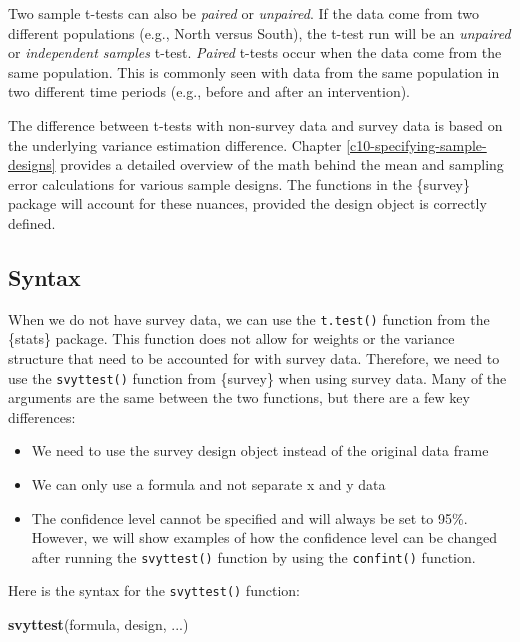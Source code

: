 \documentclass[
]{krantz}
\makeatletter
\newenvironment{Shaded}{\begin{snugshade}}{\end{snugshade}}
\newcommand{\FunctionTok}[1]{\textcolor[rgb]{0.27,0.27,0.27}{\textbf{#1}}}
\newcommand{\NormalTok}[1]{#1}
\providecommand{\tightlist}{%
  \setlength{\itemsep}{0pt}\setlength{\parskip}{0pt}}
\newenvironment{kframe}{%
\medskip{}
\setlength{\fboxsep}{.8em}
 \def\at@end@of@kframe{}%
 \ifinner\ifhmode%
  \def\at@end@of@kframe{\end{minipage}}%
  \begin{minipage}{\columnwidth}%
 \fi\fi%
 \def\FrameCommand##1{\hskip\@totalleftmargin \hskip-\fboxsep
 \colorbox{shadecolor}{##1}\hskip-\fboxsep
     \hskip-\linewidth \hskip-\@totalleftmargin \hskip\columnwidth}%
 \MakeFramed {\advance\hsize-\width
   \@totalleftmargin\z@ \linewidth\hsize
   \@setminipage}}%
 {\par\unskip\endMakeFramed%
 \at@end@of@kframe}
\renewenvironment{Shaded}{\begin{kframe}}{\end{kframe}}
\makeatother
\begin{document}
Two sample t-tests can also be \emph{paired} or \emph{unpaired}. If the data come from two different populations (e.g., North versus South), the t-test run will be an \emph{unpaired} or \emph{independent samples} t-test. \emph{Paired} t-tests occur when the data come from the same population. This is commonly seen with data from the same population in two different time periods (e.g., before and after an intervention).

The difference between t-tests with non-survey data and survey data is based on the underlying variance estimation difference. Chapter \ref{c10-specifying-sample-designs} provides a detailed overview of the math behind the mean and sampling error calculations for various sample designs. The functions in the \{survey\} package will account for these nuances, provided the design object is correctly defined.

\hypertarget{stattest-ttest-syntax}{%
\subsection{Syntax}\label{stattest-ttest-syntax}}

When we do not have survey data, we can use the \texttt{t.test()} function from the \{stats\} package. This function does not allow for weights or the variance structure that need to be accounted for with survey data. Therefore, we need to use the \texttt{svyttest()} function from \{survey\} when using survey data. Many of the arguments are the same between the two functions, but there are a few key differences:

\begin{itemize}
\tightlist
\item
  We need to use the survey design object instead of the original data frame
\item
  We can only use a formula and not separate x and y data
\item
  The confidence level cannot be specified and will always be set to 95\%. However, we will show examples of how the confidence level can be changed after running the \texttt{svyttest()} function by using the \texttt{confint()} function.
\end{itemize}

Here is the syntax for the \texttt{svyttest()} function:

\begin{Shaded}
\begin{Highlighting}[]
\FunctionTok{svyttest}\NormalTok{(formula,}
\NormalTok{         design,}
\NormalTok{         ...)}
\end{Highlighting}
\end{Shaded}
\end{document}
